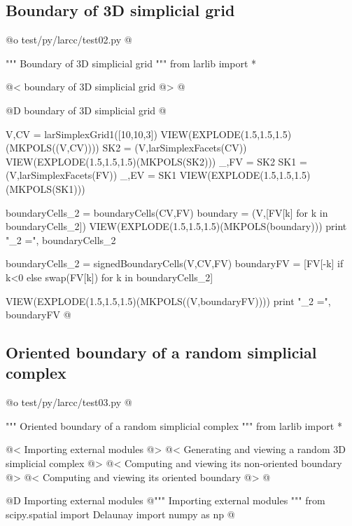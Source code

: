\documentclass[11pt,oneside]{article}	%
\begin{document}
\subsection{Boundary of 3D simplicial grid}

@o test/py/larcc/test02.py
@{""" Boundary of 3D simplicial grid """
from larlib import *

@< boundary of 3D simplicial grid @>
@}

@D boundary of 3D simplicial grid
@{
V,CV = larSimplexGrid1([10,10,3])
VIEW(EXPLODE(1.5,1.5,1.5)(MKPOLS((V,CV))))
SK2 = (V,larSimplexFacets(CV))
VIEW(EXPLODE(1.5,1.5,1.5)(MKPOLS(SK2)))
_,FV = SK2
SK1 = (V,larSimplexFacets(FV))
_,EV = SK1
VIEW(EXPLODE(1.5,1.5,1.5)(MKPOLS(SK1)))

boundaryCells_2 = boundaryCells(CV,FV)
boundary = (V,[FV[k] for k in boundaryCells_2])
VIEW(EXPLODE(1.5,1.5,1.5)(MKPOLS(boundary)))
print "\nboundaryCells_2 =\n", boundaryCells_2

boundaryCells_2 = signedBoundaryCells(V,CV,FV)
boundaryFV = [FV[-k] if k<0 else swap(FV[k]) for k in boundaryCells_2]

VIEW(EXPLODE(1.5,1.5,1.5)(MKPOLS((V,boundaryFV))))
print "\nboundaryCells_2 =\n", boundaryFV
@}


\subsection{Oriented boundary of a random simplicial complex}


@o test/py/larcc/test03.py
@{""" Oriented boundary of a random simplicial complex """
from larlib import *

@< Importing external modules @>
@< Generating and viewing a random 3D simplicial complex @>
@< Computing and viewing its non-oriented boundary @>
@< Computing and viewing its oriented boundary @>
@}


@D Importing external modules
@{""" Importing external modules """
from scipy.spatial import Delaunay
import numpy as np
@}
\end{document}

